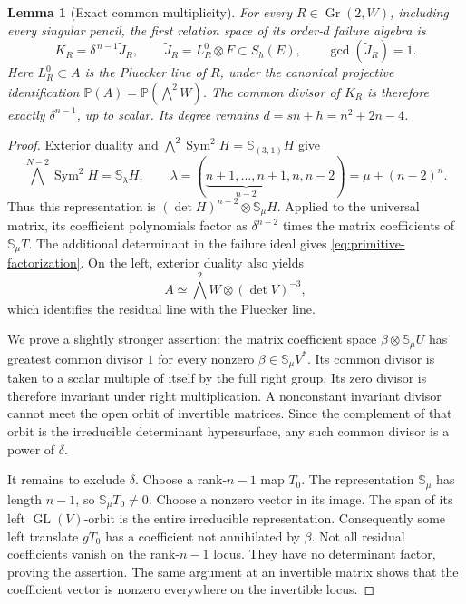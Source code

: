 \documentclass[11pt,reqno]{amsart}
\numberwithin{equation}{section}
\newtheorem{lemma}[theorem]{Lemma}
\theoremstyle{definition}\newtheorem{definition}[theorem]{Definition}
\theoremstyle{remark}\newtheorem{remark}[theorem]{Remark}
\newcommand{\Pj}{\mathbb P}\newcommand{\A}{\mathbb A}
\DeclareMathOperator{\Sym}{Sym}\DeclareMathOperator{\Gr}{Gr}
\begin{document}
\begin{lemma}[Exact common multiplicity]\label{lem:primitive-pencil}
For every \(R\in\Gr(2,W)\), including every singular pencil, the
first relation space of its order-\(d\) failure algebra is
\begin{equation}\label{eq:primitive-factorization}
 K_R=\delta^{\,n-1}\widetilde J_R,\qquad
 \widetilde J_R=L_R^0\otimes F\subset S_h(E),
                   \qquad \gcd(\widetilde J_R)=1.
\end{equation}
Here \(L_R^0\subset A\) is the Pluecker line of \(R\), under the
canonical projective identification
\(\Pj(A)=\Pj(\bigwedge^2W)\).
The common divisor of \(K_R\) is therefore exactly
\(\delta^{n-1}\), up to scalar.  Its degree remains
\(d=sn+h=n^2+2n-4\).
\end{lemma}
\begin{proof}
Exterior duality and
\(\bigwedge^2\Sym^2H=\mathbb S_{(3,1)}H\) give
\[
 \bigwedge^{N-2}\Sym^2H
   =\mathbb S_{\lambda}H,\qquad
 \lambda=(\underbrace{n+1,\ldots,n+1}_{n-2},n,n-2)
   =\mu+(n-2)^n.
\]
Thus this representation is
\((\det H)^{n-2}\otimes\mathbb S_\mu H\).
Applied to the universal matrix, its coefficient polynomials factor
as \(\delta^{n-2}\) times the matrix coefficients of
\(\mathbb S_\mu T\).  The additional determinant in the failure
ideal gives \eqref{eq:primitive-factorization}.  On the left,
exterior duality also yields
\[
                A\simeq\bigwedge^2W\otimes(\det V)^{-3},
\]
which identifies the residual line with the Pluecker line.

We prove a slightly stronger assertion: the matrix coefficient
space \(\beta\otimes\mathbb S_\mu U\) has greatest common divisor
\(1\) for every nonzero \(\beta\in\mathbb S_\mu V^*\).
Its common divisor is taken to a scalar multiple of itself by the
full right group.  Its zero divisor is therefore invariant under
right multiplication.  A nonconstant invariant divisor cannot meet
the open orbit of invertible matrices.  Since the complement of
that orbit is the irreducible determinant hypersurface, any such
common divisor is a power of \(\delta\).

It remains to exclude \(\delta\).  Choose a rank-\(n-1\) map
\(T_0\).  The representation \(\mathbb S_\mu\) has length \(n-1\),
so \(\mathbb S_\mu T_0\ne0\).  Choose a nonzero vector in its image.
The span of its left \(\operatorname{GL}(V)\)-orbit is the entire
irreducible representation.  Consequently some left translate
\(gT_0\) has a coefficient not annihilated by \(\beta\).
Not all residual coefficients vanish on the rank-\(n-1\) locus.
They have no determinant factor, proving the assertion.  The same
argument at an invertible matrix shows that the coefficient vector
is nonzero everywhere on the invertible locus.
\end{proof}
\end{document}
